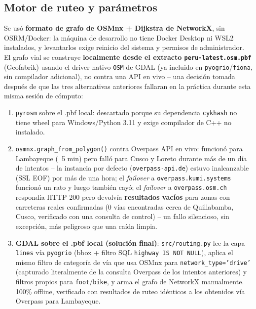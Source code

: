 \documentclass[11pt]{article}
\begin{document}
\subsection{Motor de ruteo y parámetros}

Se usó \textbf{formato de grafo de OSMnx + Dijkstra de NetworkX}, sin
OSRM/Docker: la máquina de desarrollo no tiene Docker Desktop ni WSL2
instalados, y levantarlos exige reinicio del sistema y permisos de
administrador. El grafo vial se construye \textbf{localmente desde el
extracto \texttt{peru-latest.osm.pbf}} (Geofabrik) usando el driver nativo
\texttt{OSM} de GDAL (ya incluido en \texttt{pyogrio}/\texttt{fiona}, sin
compilador adicional), no contra una API en vivo -- una decisión tomada
después de que las tres alternativas anteriores fallaran en la práctica
durante esta misma sesión de cómputo:

\begin{enumerate}
  \item \texttt{pyrosm} sobre el .pbf local: descartado porque su
  dependencia \texttt{cykhash} no tiene wheel para Windows/Python 3.11 y
  exige compilador de C++ no instalado.
  \item \texttt{osmnx.graph\_from\_polygon()} contra Overpass API en vivo:
  funcionó para Lambayeque (~5 min) pero falló para Cusco y Loreto durante
  más de un día de intentos -- la instancia por defecto
  (\texttt{overpass-api.de}) estuvo inalcanzable (SSL EOF) por más de una
  hora; el \emph{failover} a \texttt{overpass.kumi.systems} funcionó un
  rato y luego también cayó; el \emph{failover} a \texttt{overpass.osm.ch}
  respondía HTTP 200 pero devolvía \textbf{resultados vacíos} para zonas
  con carreteras reales confirmadas (0 vías encontradas cerca de
  Quillabamba, Cusco, verificado con una consulta de control) -- un fallo
  silencioso, sin excepción, más peligroso que una caída limpia.
  \item \textbf{GDAL sobre el .pbf local (solución final)}: \texttt{src/routing.py}
  lee la capa \texttt{lines} vía \texttt{pyogrio} (bbox + filtro SQL
  \texttt{highway IS NOT NULL}), aplica el mismo filtro de categoría de vía
  que usa OSMnx para \texttt{network\_type='drive'} (capturado literalmente
  de la consulta Overpass de los intentos anteriores) y filtros propios
  para \texttt{foot}/\texttt{bike}, y arma el grafo de NetworkX
  manualmente. 100\% offline, verificado con resultados de ruteo idénticos
  a los obtenidos vía Overpass para Lambayeque.
\end{enumerate}
\end{document}

